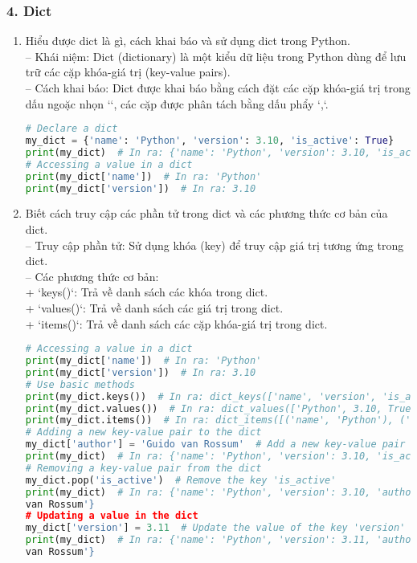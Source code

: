 \subsubsection*{4. Dict}
\begin{enumerate}[label=\alph*.]
    \item Hiểu được dict là gì, cách khai báo và sử dụng dict trong Python.\\
    -- Khái niệm: Dict (dictionary) là một kiểu dữ liệu trong Python dùng để lưu trữ các cặp khóa-giá trị (key-value pairs).\\
    -- Cách khai báo: Dict được khai báo bằng cách đặt các cặp khóa-giá trị trong dấu ngoặc nhọn `{}`, các cặp được phân tách bằng dấu phẩy `,`.
    \begin{lstlisting}[language=Python]
# Declare a dict
my_dict = {'name': 'Python', 'version': 3.10, 'is_active': True}
print(my_dict)  # In ra: {'name': 'Python', 'version': 3.10, 'is_active': True}
# Accessing a value in a dict
print(my_dict['name'])  # In ra: 'Python'
print(my_dict['version'])  # In ra: 3.10
    \end{lstlisting}
    \vspace{-4.5em}
    \item Biết cách truy cập các phần tử trong dict và các phương thức cơ bản của dict.\\
    -- Truy cập phần tử: Sử dụng khóa (key) để truy cập giá trị tương ứng trong dict.\\
    -- Các phương thức cơ bản:\\
        + `keys()`: Trả về danh sách các khóa trong dict.\\
        + `values()`: Trả về danh sách các giá trị trong dict.\\
        + `items()`: Trả về danh sách các cặp khóa-giá trị trong dict.
    \begin{lstlisting}[language=Python]
# Accessing a value in a dict
print(my_dict['name'])  # In ra: 'Python'
print(my_dict['version'])  # In ra: 3.10
# Use basic methods
print(my_dict.keys())  # In ra: dict_keys(['name', 'version', 'is_active'])
print(my_dict.values())  # In ra: dict_values(['Python', 3.10, True])
print(my_dict.items())  # In ra: dict_items([('name', 'Python'), ('version', 3.10), ('is_active', True)])
# Adding a new key-value pair to the dict
my_dict['author'] = 'Guido van Rossum'  # Add a new key-value pair
print(my_dict)  # In ra: {'name': 'Python', 'version': 3.10, 'is_active': True, 'author': 'Guido van Rossum'}
# Removing a key-value pair from the dict
my_dict.pop('is_active')  # Remove the key 'is_active'
print(my_dict)  # In ra: {'name': 'Python', 'version': 3.10, 'author': 'Guido
van Rossum'}
# Updating a value in the dict
my_dict['version'] = 3.11  # Update the value of the key 'version'
print(my_dict)  # In ra: {'name': 'Python', 'version': 3.11, 'author': 'Guido
van Rossum'}
    \end{lstlisting}
\end{enumerate}
\vspace*{-6.5em}
